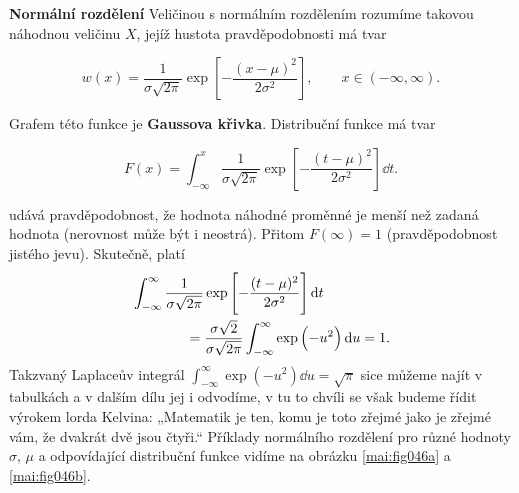 \begin{mdframed}[style=mdexam]
\begin{example}\label{mai:exam069} \textbf{Normální rozdělení}\newline
  Veličinou s normálním rozdělením rozumíme takovou náhodnou veličinu \(X\), jejíž hustota 
  pravděpodobnosti má tvar
  \begin{mdframed}[style=highlight]
    \begin{equation}\label{mai:eq069}
      w(x) = \dfrac{1}{\sigma\sqrt{2\pi}}\exp\left[-\dfrac{(x-\mu)^2}{2\sigma^2}\right],
             \qquad x\in(-\infty, \infty).
    \end{equation}
  \end{mdframed}
  Grafem této funkce je \textbf{Gaussova křivka}. Distribuční funkce má tvar
  \begin{mdframed}[style=highlight]
    \begin{equation}\label{mai:eq70}
      F(x) = \int_{-\infty}^{x}\dfrac{1}{\sigma\sqrt{2\pi}}
               \exp\left[-\dfrac{(t-\mu)^2}{2\sigma^2}\right]\dd{t}.
    \end{equation}
  \end{mdframed}
  udává pravděpodobnost, že hodnota náhodné proměnné je menší než zadaná hodnota (nerovnost může 
  být i neostrá). Přitom \(F(\infty) = 1\) (pravděpodobnost jistého jevu). Skutečně, platí
  \begin{equation*}
    \begin{multlined}
      \int_{-\infty}^{\infty}\dfrac{1}{\sigma\sqrt{2\pi}}
      \exp\left[-\dfrac{(t-\mu)^2}{2\sigma^2}\right]\dd{t}   \\
      \shoveleft[1cm]= \dfrac{\sigma\sqrt{2}}{\sigma\sqrt{2\pi}}
              \int_{-\infty}^{\infty}\exp\left(-u^2\right)\dd{u} =1.
    \end{multlined}
  \end{equation*}
  Takzvaný Laplaceův integrál \(\int_{-\infty}^{\infty}\exp(-u^2)\dd{u} = \sqrt{\pi}\) 
  sice můžeme najít v tabulkách a v dalším dílu jej i odvodíme, v tu to chvíli se však budeme řídit 
  výrokem lorda Kelvina: „Matematik je ten, komu je toto zřejmé jako je zřejmé vám, že dvakrát dvě 
  jsou čtyři.“ Příklady normálního rozdělení pro různé hodnoty \(\sigma,\,\mu\) a odpovídající 
  distribuční funkce vidíme na obrázku \ref{mai:fig046a} a \ref{mai:fig046b}.


\end{example}
\end{mdframed}
